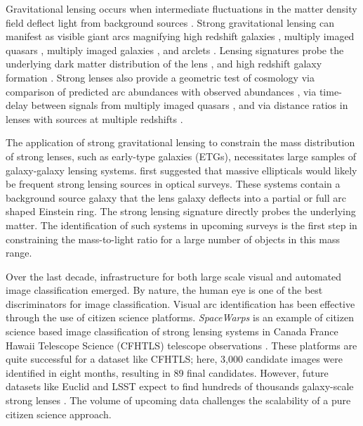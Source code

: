 \documentclass{emulateapj}
\begin{document}
Gravitational lensing occurs when intermediate fluctuations in the
matter density field deflect light from background sources
\citep[see][for a review]{kneibandnatarajan_11}.  Strong gravitational
lensing can manifest as visible giant arcs magnifying high redshift
galaxies \citep{lyndsandpetrosian_86,gladders_etal03}, multiply imaged
quasars \citep{walsh_etal79}, multiply imaged galaxies
\citep{sharon_etal05}, and arclets \citep{bezecourt_etal98}.  Lensing
signatures probe the underlying dark matter distribution of the lens
\citep{warrenanddye_03}, and high redshift galaxy formation
\citep{allam_etal07}. Strong lenses also provide a geometric test of
cosmology via comparison of predicted arc abundances with observed
abundances \citep{kochanek_96,chae_03,linder_04}, via time-delay
between signals from multiply imaged quasars
\citep{xli_etal12,suyu_etal14,suyu_etal16,bonvin_etal17}, and via
distance ratios in lenses with sources at multiple redshifts
\citep{jullo_etal10,collett_etal12,collettandauger_14}.

The application of strong gravitational lensing to constrain the mass
distribution of strong lenses, such as early-type galaxies (ETGs),
necessitates large samples of galaxy-galaxy lensing systems.
\citet{miraldaescudeandlehar_92} first suggested that massive
ellipticals would likely be frequent strong lensing sources in optical
surveys.  These systems contain a background source galaxy that the
lens galaxy deflects into a partial or full arc shaped Einstein ring.
The strong lensing signature directly probes the underlying matter.
The identification of such systems in upcoming surveys is the first
step in constraining the mass-to-light ratio for a large number of
objects in this mass range.

Over the last decade, infrastructure for both large scale visual and
automated image classification emerged. By nature, the human eye is
one of the best discriminators for image classification.  Visual arc
identification has been effective through the use of citizen science
platforms.  {\em SpaceWarps} is an example of citizen science based
image classification of strong lensing systems in Canada France Hawaii
Telescope Science (CFHTLS) telescope observations
\citep{marshall_etal16,more_etal16}.  These platforms are quite
successful for a dataset like CFHTLS; here, 3,000 candidate images
were identified in eight months, resulting in 89 final candidates.
However, future datasets like Euclid \citep{oguriandmarshall_10} and
LSST expect to find hundreds of thousands galaxy-scale strong lenses
\citep{collett_15}.  The volume of upcoming data challenges the
scalability of a pure citizen science approach.
\end{document}
